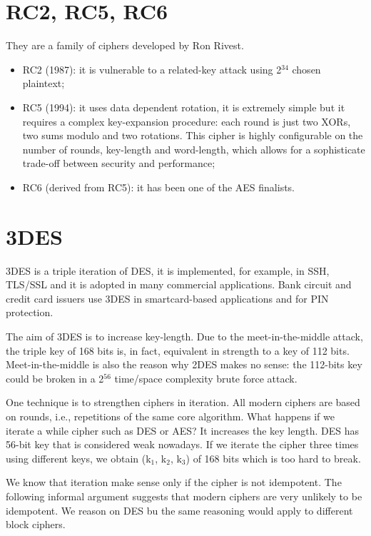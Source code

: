 \documentclass[a4paper, 12pt]{report}
\begin{document}
\section*{RC2, RC5, RC6}
They are a family of ciphers developed by Ron Rivest.
\begin{itemize}
	\item RC2 (1987): it is vulnerable to a related-key attack using 2$^{34}$ chosen plaintext;
	\item RC5 (1994): it uses data dependent rotation, it is extremely simple but it requires a complex key-expansion procedure: each round is just two XORs, two sums modulo and two rotations. This cipher is highly configurable on the number of rounds, key-length and word-length, which allows for a sophisticate trade-off between security and performance;
	\item RC6 (derived from RC5): it has been one of the AES finalists. 
\end{itemize}

\section*{3DES}
3DES is a triple iteration of DES, it is implemented, for example, in SSH, TLS/SSL and it is adopted in many commercial applications. Bank circuit and credit card issuers use 3DES in smartcard-based applications and for PIN protection.

The aim of 3DES is to increase key-length. Due to the meet-in-the-middle attack, the triple key of 168 bits is, in fact, equivalent in strength to a key of 112 bits. Meet-in-the-middle is also the reason why 2DES makes no sense: the 112-bits key could be broken in a 2$^{56}$ time/space complexity brute force attack.

One technique is to strengthen ciphers in iteration. All modern ciphers are based on rounds, i.e., repetitions of the same core algorithm. What happens if we iterate a while cipher such as DES or AES? It increases the key length. DES has 56-bit key that is considered weak nowadays. If we iterate the cipher three times using different keys, we obtain (k$_1$, k$_2$, k$_3$) of 168 bits which is too hard to break.

We know that iteration make sense only if the cipher is not idempotent. The following informal argument suggests that modern ciphers are very unlikely to be idempotent. We reason on DES bu the same reasoning would apply to different block ciphers.
\end{document}
